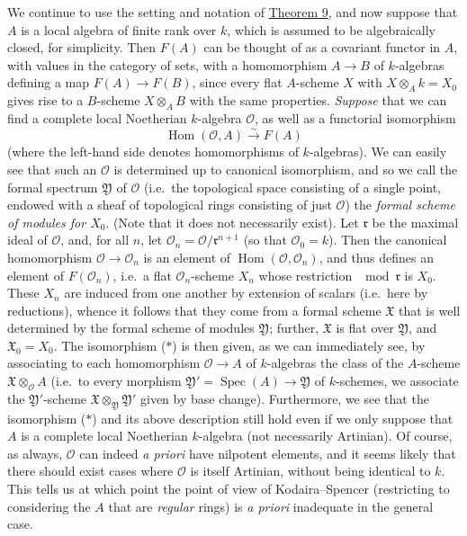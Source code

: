 \documentclass{article}
\theoremstyle{definition}
\theoremstyle{definition}
\theoremstyle{definition}
\theoremstyle{definition}
\theoremstyle{remark}
\begin{document}
We continue to use the setting and notation of \protect\hyperlink{fga-2-theorem-9}{Theorem 9}, and now suppose that \(A\) is a local algebra of finite rank over \(k\), which is assumed to be algebraically closed, for simplicity.
Then \(F(A)\) can be thought of as a covariant functor in \(A\), with values in the category of sets, with a homomorphism \(A\to B\) of \(k\)-algebras defining a map \(F(A)\to F(B)\), since every flat \(A\)-scheme \(X\) with \(X\otimes_Ak=X_0\) gives rise to a \(B\)-scheme \(X\otimes_AB\) with the same properties.
\emph{Suppose} that we can find a complete local Noetherian \(k\)-algebra \({\mathcal{O}}\), as well as a functorial isomorphism
\[
  \operatorname{Hom}({\mathcal{O}},A) \xrightarrow{\sim} F(A)
  \tag{$*$}
\]
(where the left-hand side denotes homomorphisms of \(k\)-algebras).
We can easily see that such an \({\mathcal{O}}\) is determined up to canonical isomorphism, and so we call the formal spectrum \({\mathfrak{Y}}\) of \({\mathcal{O}}\) (i.e.~the topological space consisting of a single point, endowed with a sheaf of topological rings consisting of just \({\mathcal{O}}\)) the \emph{formal scheme of modules for \(X_0\)}.
(Note that it does not necessarily exist).
Let \({\mathfrak{r}}\) be the maximal ideal of \({\mathcal{O}}\), and, for all \(n\), let \({\mathscr{O}}_n={\mathcal{O}}/{\mathfrak{r}}^{n+1}\) (so that \({\mathscr{O}}_0=k\)).
Then the canonical homomorphism \({\mathcal{O}}\to{\mathscr{O}}_n\) is an element of \(\operatorname{Hom}({\mathcal{O}},{\mathscr{O}}_n)\), and thus defines an element of \(F({\mathscr{O}}_n)\), i.e.~a flat \({\mathscr{O}}_n\)-scheme \(X_n\) whose restriction \(\mod{\mathfrak{r}}\) is \(X_0\).
These \(X_n\) are induced from one another by extension of scalars (i.e.~here by reductions), whence it follows that they come from a formal scheme \({\mathfrak{X}}\) that is well determined by the formal scheme of modules \({\mathfrak{Y}}\);
further, \({\mathfrak{X}}\) is flat over \({\mathfrak{Y}}\), and \({\mathfrak{X}}_0=X_0\).
The isomorphism (\(*\)) is then given, as we can immediately see, by associating to each homomorphism \({\mathcal{O}}\to A\) of \(k\)-algebras the class of the \(A\)-scheme \({\mathfrak{X}}\otimes_{{\mathcal{O}}} A\) (i.e.~to every morphism \({\mathfrak{Y}}'=\operatorname{Spec}(A)\to{\mathfrak{Y}}\) of \(k\)-schemes, we associate the \({\mathfrak{Y}}'\)-scheme \({\mathfrak{X}}\otimes_{{\mathfrak{Y}}}{\mathfrak{Y}}'\) given by base change).
Furthermore, we see that the isomorphism (\(*\)) and its above description still hold even if we only suppose that \(A\) is a complete local Noetherian \(k\)-algebra (not necessarily Artinian).
Of course, as always, \({\mathcal{O}}\) can indeed \emph{a priori} have nilpotent elements, and it seems likely that there should exist cases where \({\mathcal{O}}\) is itself Artinian, without being identical to \(k\).
This tells us at which point the point of view of Kodaira--Spencer (restricting to considering the \(A\) that are \emph{regular} rings) is \emph{a priori} inadequate in the general case.
\end{document}
